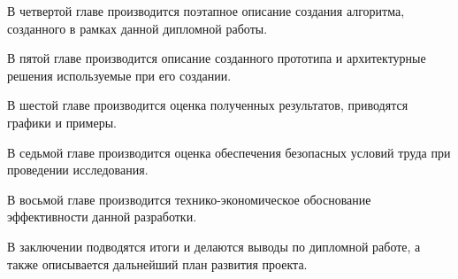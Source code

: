 В четвертой главе производится поэтапное описание создания алгоритма, созданного в рамках данной дипломной работы. %

В пятой главе производится описание созданного прототипа и архитектурные решения используемые при его создании.

В шестой главе производится оценка полученных результатов, приводятся графики и примеры.

В седьмой главе производится оценка обеспечения безопасных условий труда при проведении исследования.

В восьмой главе производится технико-экономическое обоснование эффективности данной разработки.

В заключении подводятся итоги и делаются выводы по дипломной работе, а также описывается дальнейший план развития проекта.

\clearpage
